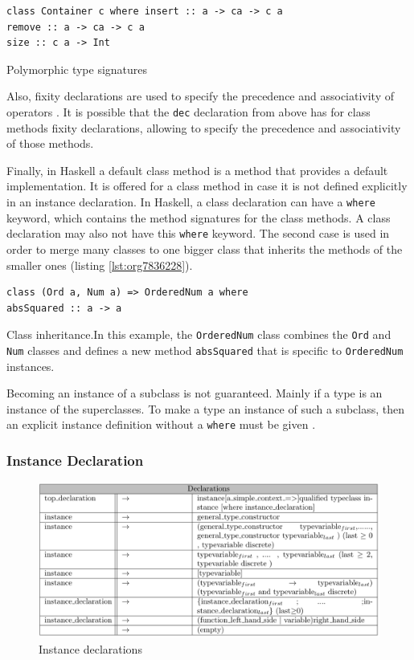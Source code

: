 \documentclass[a4paper, titlepage, twoside]{article}
\begin{document}
\begin{listing}[htbp]
\begin{verbatim}
class Container c where insert :: a -> ca -> c a
remove :: a -> ca -> c a
size :: c a -> Int
\end{verbatim}
\caption{\label{lst:org8e669a6}Polymorphic type signatures}
\end{listing}

Also, fixity declarations are used to specify the precedence and associativity of operators \autocite{marlowHaskell2010Language2010}. It is possible that the \texttt{dec} declaration from above has for class methods fixity declarations, allowing to specify the precedence and associativity of those methods.

Finally, in Haskell a default class method is a method that provides a default implementation. It is offered for a class method in case it is not defined explicitly in an instance declaration. In Haskell, a class declaration can have a \texttt{where} keyword, which contains the method signatures for the class methods. A class declaration may also not have this \texttt{where} keyword. The second case is used in order to merge many classes to one bigger class that inherits the methods of the smaller ones (listing \ref{lst:org7836228}).

\begin{listing}[htbp]
\begin{verbatim}
class (Ord a, Num a) => OrderedNum a where
absSquared :: a -> a
\end{verbatim}
\caption[Class inheritance]{\label{lst:org7836228}Class inheritance.In this example, the \texttt{OrderedNum} class combines the \texttt{Ord} and \texttt{Num} classes and defines a new method \texttt{absSquared} that is specific to \texttt{OrderedNum} instances.}
\end{listing}

Becoming an instance of a subclass is not guaranteed. Mainly if a type is an instance of the superclasses. To make a type an instance of such a subclass, then an explicit instance definition without a \texttt{where} must be given \autocite{marlowHaskell2010Language2010}.

\subsubsection{Instance Declaration}
\label{sec:org07b9448}

\begin{figure}[htbp]
\centering
\includegraphics[width=.9\linewidth]{img/2023-05-25_18-46-02_screenshot.png}
\caption{Instance declarations}
\end{figure}
\end{document}
